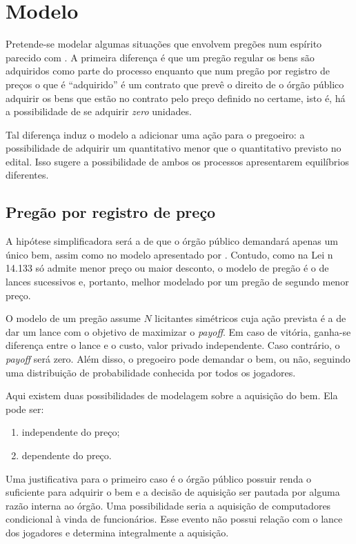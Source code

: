 \chapter{Modelo}
\label{cap:modelo}

Pretende-se modelar algumas situações que envolvem pregões num espírito parecido com \citet{Bugarin2022}. A primeira diferença é que um pregão regular os bens são adquiridos como parte do processo enquanto que num pregão por registro de preços o que é ``adquirido'' é um contrato que prevê o direito de o órgão público adquirir os bens que estão no contrato pelo preço definido no certame, isto é, há a possibilidade de se adquirir \emph{zero} unidades.

Tal diferença induz o modelo a adicionar uma ação para o pregoeiro: a possibilidade de adquirir um quantitativo menor que o quantitativo previsto no edital. Isso sugere a possibilidade de ambos os processos apresentarem equilíbrios diferentes.

\section{Pregão por registro de preço}

A hipótese simplificadora será a de que o órgão público demandará apenas um único bem, assim como no modelo apresentado por \citet{Bugarin2022}. Contudo, como na Lei n{\textordmasculine} 14.133 só admite menor preço ou maior desconto, o modelo de pregão é o de lances sucessivos e, portanto, melhor modelado por um pregão de segundo menor preço.

O modelo de um pregão assume $N$ licitantes simétricos cuja ação prevista é a de dar um lance com o objetivo de maximizar o \emph{payoff}. Em caso de vitória, ganha-se diferença entre o lance e o custo, valor privado independente. Caso contrário, o \emph{payoff} será zero. Além disso, o pregoeiro pode demandar o bem, ou não, seguindo uma distribuição de probabilidade conhecida por todos os jogadores.

Aqui existem duas possibilidades de modelagem sobre a aquisição do bem. Ela pode ser:
\begin{enumerate}
	\item independente do preço;
	\item dependente do preço.
\end{enumerate}

Uma justificativa para o primeiro caso é o órgão público possuir renda o suficiente para adquirir o bem e a decisão de aquisição ser pautada por alguma razão interna ao órgão. Uma possibilidade seria a aquisição de computadores condicional à vinda de funcionários. Esse evento não possui relação com o lance dos jogadores e determina integralmente a aquisição.

